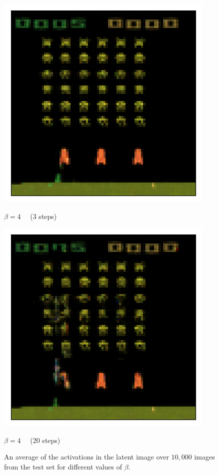 \begin{figure}[h!]
\begin{multicols}{4}
    \includegraphics[scale=0.4]{figures/results/colour_separated/beta_4_posterior_sample_4.png}
    \caption{$\beta=4\quad$ (3 steps)}
    \includegraphics[scale=0.4]{figures/results/colour_separated/beta_4_posterior_sample_20.png}
    \caption{$\beta=4\quad$ (20 steps)}
\end{multicols}

\caption{An average of the activations in the latent image over $10,000$ images from the test set for different values of $\beta$.}
\label{fig:weighted_average_posterior_samples}
\end{figure}


